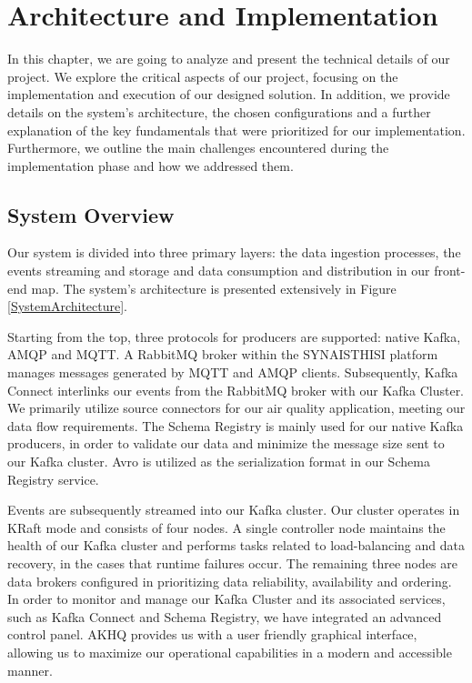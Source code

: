 \chapter{Architecture and Implementation}
\label{chap4}
In this chapter, we are going to analyze and present the technical details of our project. 
We explore the critical aspects of our project, focusing on the implementation and execution of our designed solution. In addition, we provide details on the system's architecture, the chosen configurations and a further explanation of the key fundamentals that were prioritized for our implementation. Furthermore, we outline the main challenges encountered during the implementation phase and how we addressed them.

\section{System Overview}
\label{system_overview}
Our system is divided into three primary layers: the data ingestion processes, the events streaming and storage and data consumption and distribution in our front-end map. The system's architecture is presented extensively in Figure \ref{SystemArchitecture}.

Starting from the top, three protocols for producers are supported: native Kafka, AMQP and MQTT. A RabbitMQ broker within the SYNAISTHISI platform manages messages generated by MQTT and AMQP clients. Subsequently, Kafka Connect interlinks our events from the RabbitMQ broker with our Kafka Cluster. We primarily utilize source connectors for our air quality application, meeting our data flow requirements. The Schema Registry is mainly used for our native Kafka producers, in order to validate our data and minimize the message size sent to our Kafka cluster. Avro is utilized as the serialization format in our Schema Registry service.

Events are subsequently streamed into our Kafka cluster. Our cluster operates in KRaft mode and consists of four nodes. A single controller node maintains the health of our Kafka cluster and performs tasks related to load-balancing and data recovery, in the cases that runtime failures occur. The remaining three nodes are data brokers configured in prioritizing data reliability, availability and ordering. In order to monitor and manage our Kafka Cluster and its associated services, such as Kafka Connect and Schema Registry, we have integrated an advanced control panel. AKHQ \cite{AKHQ} provides us with a user friendly graphical interface, allowing us to maximize our operational capabilities in a modern and accessible manner.

